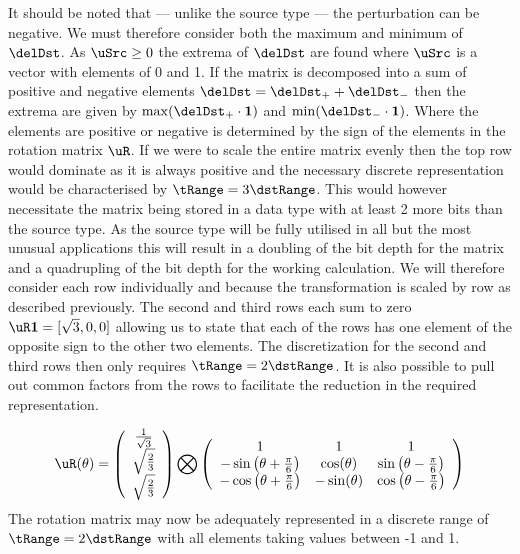 It should be noted that --- unlike the source type \uSrc --- the perturbation can be negative. We must therefore consider both the maximum and minimum of $\delDst$. As $\uSrc \ge 0$ the extrema of $\delDst$ are found where $\uSrc$ is a vector with elements of 0 and 1. If the matrix is decomposed into a sum of positive and negative elements $\delDst = \delDst_+ + \delDst_-$ then the extrema are given by $\max(\delDst_+ \cdot \mathbf{1})$ and $\min(\delDst_- \cdot \mathbf{1})$. Where the elements are positive or negative is determined by the sign of the elements in the rotation matrix $\uR$. If we were to scale the entire matrix evenly then the top row would dominate as it is always positive and the necessary discrete representation would be characterised by $\tRange = 3 \dstRange$. This would however necessitate the matrix being stored in a data type with at least 2 more bits than the source type. As the source type will be fully utilised in all but the most unusual applications this will result in a doubling of the bit depth for the matrix and a quadrupling of the bit depth for the working calculation. We will therefore consider each row individually and because the transformation is scaled by row as described previously. The second and third rows each sum to zero $\uR \mathbf{1} = [\sqrt{3},0,0]$ allowing us to state that each of the rows has one element of the opposite sign to the other two elements. The discretization for the second and third rows then only requires $\tRange = 2 \dstRange$. It is also possible to pull out common factors from the rows to facilitate the reduction in the required representation.

\begin{equation}
\uR(\theta) =
\left(
\begin{array}{c}
 \frac{1}{\sqrt{3}} \\
 \sqrt{\frac{2}{3}}  \\
 \sqrt{\frac{2}{3}} \\
\end{array}
\right) \bigotimes
\left(
\begin{array}{ccc}
 1 & 1 & 1 \\
 -\sin \left(\theta +\frac{\pi }{6}\right) &  \cos (\theta ) &  \sin \left(\theta -\frac{\pi }{6}\right) \\
 -\cos \left(\theta +\frac{\pi }{6}\right) & - \sin (\theta ) & \cos \left(\theta -\frac{\pi }{6}\right) \\
\end{array}
\right)
\end{equation}
The rotation matrix may now be adequately represented in a discrete range of $\tRange = 2 \dstRange$ with all elements taking values between -1 and 1.

